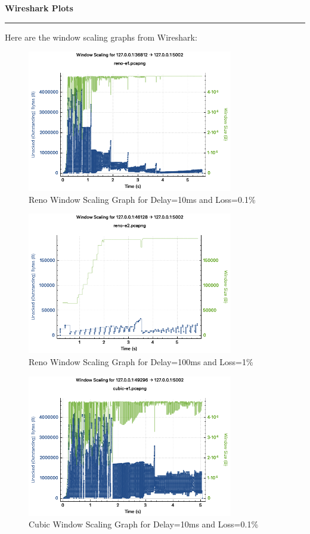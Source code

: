 \documentclass[a4paper,12pt]{article}
\newenvironment{solution}[2][]{%
    \begin{mdframed}[linecolor=blue!70!black, linewidth=2pt, roundcorner=10pt, backgroundcolor=yellow!10!white, skipabove=12pt, skipbelow=12pt]%
        \textbf{\large #2}
        \par\noindent\rule{\textwidth}{0.4pt}
}{
    \end{mdframed}
}
\begin{document}
\begin{solution}{Wireshark Plots}
    Here are the window scaling graphs from Wireshark:
    \begin{figure}[H]
        \centering
        \includegraphics[width=0.8\textwidth]{reno-e1.png}
        \caption{Reno Window Scaling Graph for Delay=10ms and Loss=0.1\%}
    \end{figure}

    \begin{figure}[H]
        \centering
        \includegraphics[width=0.8\textwidth]{reno-e2.png}
        \caption{Reno Window Scaling Graph for Delay=100ms and Loss=1\%}
    \end{figure}

    \begin{figure}[H]
        \centering
        \includegraphics[width=0.8\textwidth]{cubic-e1.png}
        \caption{Cubic Window Scaling Graph for Delay=10ms and Loss=0.1\%}
    \end{figure}


\end{solution}
\end{document}

